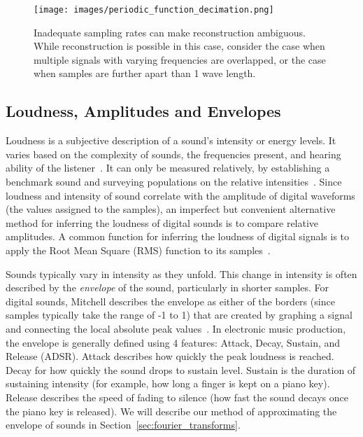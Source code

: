 \documentclass[\main/thesis.tex]{subfiles}
\begin{document}
\begin{figure}[tbp]

\centering
\texttt{[image: images/periodic\_function\_decimation.png]}
\caption{Inadequate sampling rates can make reconstruction ambiguous. While reconstruction is possible in this case, consider the case when multiple signals with varying frequencies are overlapped, or the case when samples are further apart than 1 wave length.} 
\label{fig_sampling_rate}
\end{figure}


\subsection{Loudness, Amplitudes and Envelopes}
\label{sec:adsr}
Loudness is a subjective description of a sound's intensity or energy levels. It varies based on the complexity of sounds, the frequencies present, and hearing ability of the listener~\cite{fletcher1933loudness,cook1999chap6}. It can only be measured relatively, by establishing a benchmark sound and surveying populations on the relative intensities~\cite{cook1999chap6}. Since loudness and intensity of sound correlate with the amplitude of digital waveforms (the values assigned to the samples), an imperfect but convenient alternative method for inferring the loudness of digital sounds is to compare relative amplitudes. A common function for inferring the loudness of digital signals is to apply the Root Mean Square (RMS) function to its samples~\cite{zwicker1977procedure}. 

Sounds typically vary in intensity as they unfold. This change in intensity is often described by the \textit{envelope} of the sound, particularly in shorter samples. For digital sounds, Mitchell describes the envelope as either of the borders (since samples typically take the range of -1 to 1) that are created by graphing a signal and connecting the local absolute peak values~\cite{mitchell2009basicsynthChap6}. In electronic music production, the envelope is generally defined using 4 features: Attack, Decay, Sustain, and Release (ADSR). Attack describes how quickly the peak loudness is reached. Decay for how quickly the sound drops to sustain level. Sustain is the duration of sustaining intensity (for example, how long a finger is kept on a piano key). Release describes the speed of fading to silence (how fast the sound decays once the piano key is released). We will describe our method of approximating the envelope of sounds in Section~\ref{sec:fourier_transforms}.
\end{document}
